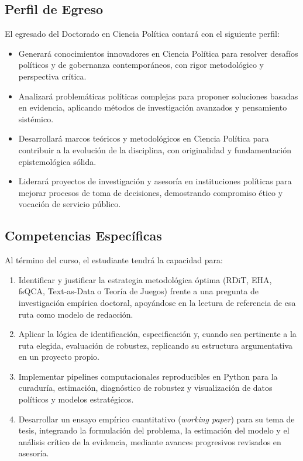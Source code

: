 \documentclass[11pt,a4paper]{article}
\begin{document}
\subsection{Perfil de Egreso}
El egresado del Doctorado en Ciencia Política contará con el siguiente perfil:
\begin{itemize}
    \item Generará conocimientos innovadores en Ciencia Política para resolver desafíos políticos y de gobernanza contemporáneos, con rigor metodológico y perspectiva crítica.
    \item Analizará problemáticas políticas complejas para proponer soluciones basadas en evidencia, aplicando métodos de investigación avanzados y pensamiento sistémico.
    \item Desarrollará marcos teóricos y metodológicos en Ciencia Política para contribuir a la evolución de la disciplina, con originalidad y fundamentación epistemológica sólida.
    \item Liderará proyectos de investigación y asesoría en instituciones políticas para mejorar procesos de toma de decisiones, demostrando compromiso ético y vocación de servicio público.
\end{itemize}

\subsection{Competencias Específicas}
Al término del curso, el estudiante tendrá la capacidad para:
\begin{enumerate}
    \item Identificar y justificar la estrategia metodológica óptima (RDiT, EHA, fsQCA, Text-as-Data o Teoría de Juegos) frente a una pregunta de investigación empírica doctoral, apoyándose en la lectura de referencia de esa ruta como modelo de redacción.
    \item Aplicar la lógica de identificación, especificación y, cuando sea pertinente a la ruta elegida, evaluación de robustez, replicando su estructura argumentativa en un proyecto propio.
    \item Implementar pipelines computacionales reproducibles en Python para la curaduría, estimación, diagnóstico de robustez y visualización de datos políticos y modelos estratégicos.
    \item Desarrollar un ensayo empírico cuantitativo (\textit{working paper}) para su tema de tesis, integrando la formulación del problema, la estimación del modelo y el análisis crítico de la evidencia, mediante avances progresivos revisados en asesoría.
\end{enumerate}
\end{document}
